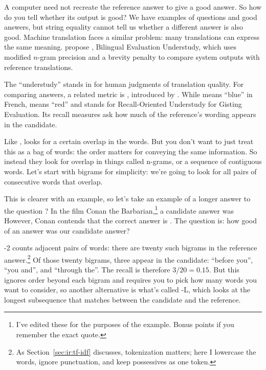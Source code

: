 A computer need not recreate the reference answer to give a good answer.  So how do you tell whether its output is good?
We have examples of questions and good answers, but string equality cannot tell us whether a different answer is also good.
Machine translation faces a similar problem: many translations can express the same meaning.  \citet{papineni-02} propose , Bilingual Evaluation Understudy, which uses modified $n$-gram precision and a brevity penalty to compare system outputs with reference translations.

The ``understudy'' stands in for human judgments of translation quality.  For comparing answers, a related metric is , introduced by \citet{lin-04}.  While  means ``blue'' in French,  means ``red'' and stands for Recall-Oriented Understudy for Gisting Evaluation.  Its recall measures ask how much of the reference's wording appears in the candidate.

Like ,  looks for a certain overlap in the words.  But you don't want to just treat this as a bag of words: the order matters for conveying the same information.  So instead they look for overlap in things called n-grams, or a sequence of contiguous words.  Let's start with bigrams for simplicity: we're going to look for all pairs of consecutive words that overlap.

This is clearer with an example, so let's take an example of a longer answer to the question ?  In the film Conan the Barbarian,\footnote{I've edited these for the purposes of the example.  Bonus points if you remember the exact quote.} a candidate answer was   However, Conan contends that the correct answer is .  The question is: how good of an answer was our candidate answer?

-2 counts adjacent pairs of words: there are twenty such bigrams in the reference answer.\footnote{As Section~\ref{sec:ir:tf-idf} discusses, tokenization matters; here I lowercase the words, ignore punctuation, and keep possessives as one token.}  Of those twenty bigrams, three appear in the candidate: ``before you'', ``you and'', and ``through the''.  The recall is therefore $3/20=0.15$.  But this ignores order beyond each bigram and requires you to pick how many words you want to consider, so another alternative is what's called -L, which looks at the longest subsequence that matches between the candidate and the reference.

